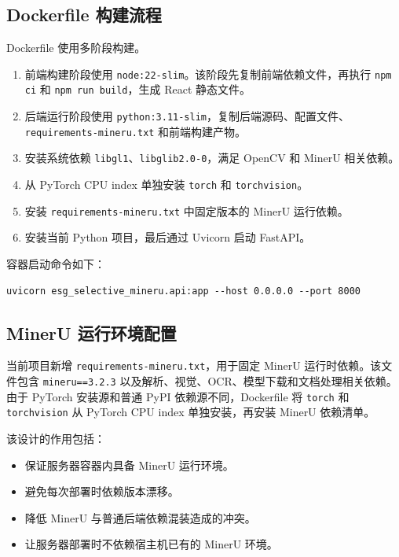 \documentclass[UTF8,a4paper,12pt]{ctexart}
\begin{document}
\subsection{Dockerfile 构建流程}

Dockerfile 使用多阶段构建。

\begin{enumerate}
  \item 前端构建阶段使用 \texttt{node:22-slim}。该阶段先复制前端依赖文件，再执行 \texttt{npm ci} 和 \texttt{npm run build}，生成 React 静态文件。
  \item 后端运行阶段使用 \texttt{python:3.11-slim}，复制后端源码、配置文件、\texttt{requirements-mineru.txt} 和前端构建产物。
  \item 安装系统依赖 \texttt{libgl1}、\texttt{libglib2.0-0}，满足 OpenCV 和 MinerU 相关依赖。
  \item 从 PyTorch CPU index 单独安装 \texttt{torch} 和 \texttt{torchvision}。
  \item 安装 \texttt{requirements-mineru.txt} 中固定版本的 MinerU 运行依赖。
  \item 安装当前 Python 项目，最后通过 Uvicorn 启动 FastAPI。
\end{enumerate}

容器启动命令如下：

\begin{lstlisting}
uvicorn esg_selective_mineru.api:app --host 0.0.0.0 --port 8000
\end{lstlisting}

\subsection{MinerU 运行环境配置}

当前项目新增 \texttt{requirements-mineru.txt}，用于固定 MinerU 运行时依赖。该文件包含 \texttt{mineru==3.2.3} 以及解析、视觉、OCR、模型下载和文档处理相关依赖。由于 PyTorch 安装源和普通 PyPI 依赖源不同，Dockerfile 将 \texttt{torch} 和 \texttt{torchvision} 从 PyTorch CPU index 单独安装，再安装 MinerU 依赖清单。

该设计的作用包括：

\begin{itemize}
  \item 保证服务器容器内具备 MinerU 运行环境。
  \item 避免每次部署时依赖版本漂移。
  \item 降低 MinerU 与普通后端依赖混装造成的冲突。
  \item 让服务器部署时不依赖宿主机已有的 MinerU 环境。
\end{itemize}
\end{document}
